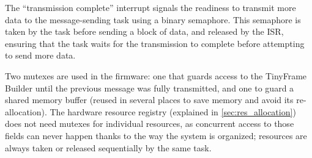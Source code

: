 The ``transmission complete'' interrupt signals the readiness to transmit more data to the message-sending task using a binary semaphore. This semaphore is taken by the task before sending a block of data, and  released by the \gls{ISR}, ensuring that the task waits for the transmission to complete before attempting to send more data.

Two mutexes are used in the firmware: one that guards access to the TinyFrame Builder until the previous message was fully transmitted, and one to guard a shared memory buffer (reused in several places to save memory and avoid its re-allocation). The hardware resource registry (explained in \cref{sec:res_allocation}) does not need mutexes for individual resources, as concurrent access to those fields can never happen thanks to the way the system is organized; resources are always taken or released sequentially by the same task.
